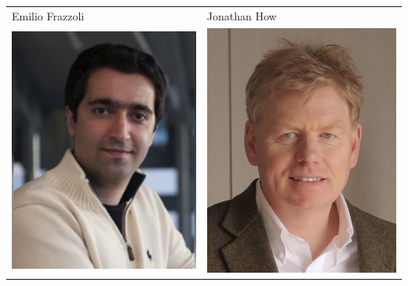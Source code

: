 \documentclass[landscape,a0paper,fontscale=0.292]{baposter}
\begin{document}
\begin{poster}
{\begin{center}
\begin{tabularx}{\linewidth}{X X}
{\tiny \centering Emilio Frazzoli }& {\tiny \centering Jonathan How }\\ 
 {\centering \includegraphics[width=0.85\linewidth]{karaman.jpg}}&
{\centering \includegraphics[width=0.85\linewidth]{leonard.jpg}}\\ 


\end{tabularx}
\end{center}}
\end{poster}
\end{document}
